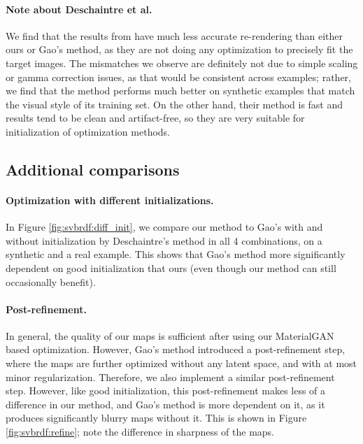 

\paragraph{Note about Deschaintre et al.}
We find that the results from \cite{deschaintre2019flexible} have much less accurate re-rendering than either ours or Gao's method, as they are not doing any optimization to precisely fit the target images. The mismatches we observe are definitely not due to simple scaling or gamma correction issues, as that would be consistent across examples; rather, we find that the method performs much better on synthetic examples that match the visual style of its training set. On the other hand, their method is fast and results tend to be clean and artifact-free, so they are very suitable for initialization of optimization methods.


\subsection{Additional comparisons}



\paragraph{Optimization with different initializations.}
In Figure \ref{fig:svbrdf:diff_init}, we compare our method to Gao's with and without initialization by Deschaintre's method in all 4 combinations, on a synthetic and a real example. This shows that Gao's method more significantly dependent on good initialization that ours (even though our method can still occasionally benefit).



\paragraph{Post-refinement.}
In general, the quality of our maps is sufficient after using our MaterialGAN based optimization. However, Gao's method introduced a post-refinement step, where the maps are further optimized without any latent space, and with at most minor regularization. Therefore, we also implement a similar post-refinement step. However, like good initialization, this post-refinement makes less of a difference in our method, and Gao's method is more dependent on it, as it produces significantly blurry maps without it. This is shown in Figure \ref{fig:svbrdf:refine}; note the difference in sharpness of the maps.

